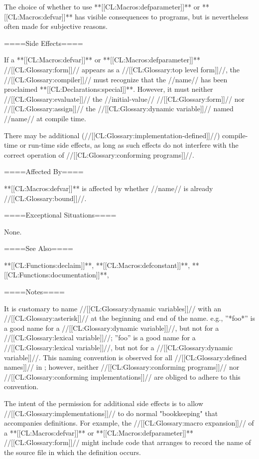 The choice of whether to use **[[CL:Macros:defparameter]]** or **[[CL:Macros:defvar]]** has visible consequences to programs, but is nevertheless often made for subjective reasons.

====Side Effects====

If a **[[CL:Macros:defvar]]** or **[[CL:Macros:defparameter]]** //[[CL:Glossary:form]]// appears as a //[[CL:Glossary:top level form]]//, the //[[CL:Glossary:compiler]]// must recognize that the //name// has been proclaimed **[[CL:Declarations:special]]**. However, it must neither //[[CL:Glossary:evaluate]]// the //initial-value// //[[CL:Glossary:form]]// nor //[[CL:Glossary:assign]]// the //[[CL:Glossary:dynamic variable]]// named //name// at compile time.

There may be additional (//[[CL:Glossary:implementation-defined]]//) compile-time or run-time side effects, as long as such effects do not interfere with the correct operation of //[[CL:Glossary:conforming programs]]//.

====Affected By====

**[[CL:Macros:defvar]]** is affected by whether //name// is already //[[CL:Glossary:bound]]//.

====Exceptional Situations====

None.

====See Also====

**[[CL:Functions:declaim]]**, **[[CL:Macros:defconstant]]**, **[[CL:Functions:documentation]]**, {\secref\Compilation}

====Notes====

It is customary to name //[[CL:Glossary:dynamic variables]]// with an //[[CL:Glossary:asterisk]]// at the beginning and end of the name. e.g., ''*foo*'' is a good name for a //[[CL:Glossary:dynamic variable]]//, but not for a //[[CL:Glossary:lexical variable]]//; ''foo'' is a good name for a //[[CL:Glossary:lexical variable]]//, but not for a //[[CL:Glossary:dynamic variable]]//. This naming convention is observed for all //[[CL:Glossary:defined names]]// in \clisp; however, neither //[[CL:Glossary:conforming programs]]// nor //[[CL:Glossary:conforming implementations]]// are obliged to adhere to this convention.

The intent of the permission for additional side effects is to allow //[[CL:Glossary:implementations]]// to do normal "bookkeeping" that accompanies definitions. For example, the //[[CL:Glossary:macro expansion]]// of a **[[CL:Macros:defvar]]** or **[[CL:Macros:defparameter]]** //[[CL:Glossary:form]]// might include code that arranges to record the name of the source file in which the definition occurs.

